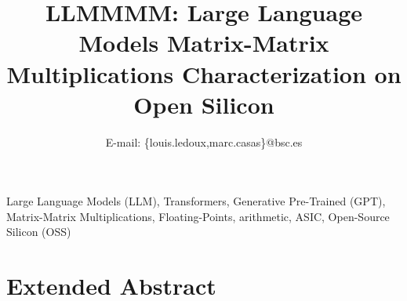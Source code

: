 \documentclass[10pt,conference,letterpaper]{IEEEtran}
\begin{document}

\title{LLMMMM: Large Language Models Matrix-Matrix Multiplications Characterization on Open Silicon}

\author{

E-mail: \{louis.ledoux,marc.casas\}@bsc.es\\

}

\maketitle


\begin{keywords}
	Large Language Models (LLM), Transformers, Generative Pre-Trained (GPT), Matrix-Matrix Multiplications, Floating-Points, arithmetic, ASIC, Open-Source Silicon (OSS)
\end{keywords}

\vspace{-4mm}
\section{Extended Abstract}






\IEEEpeerreviewmaketitle

\vspace{-2mm}


\vspace{-2mm}


%


\vspace{-7mm}
\end{document}
